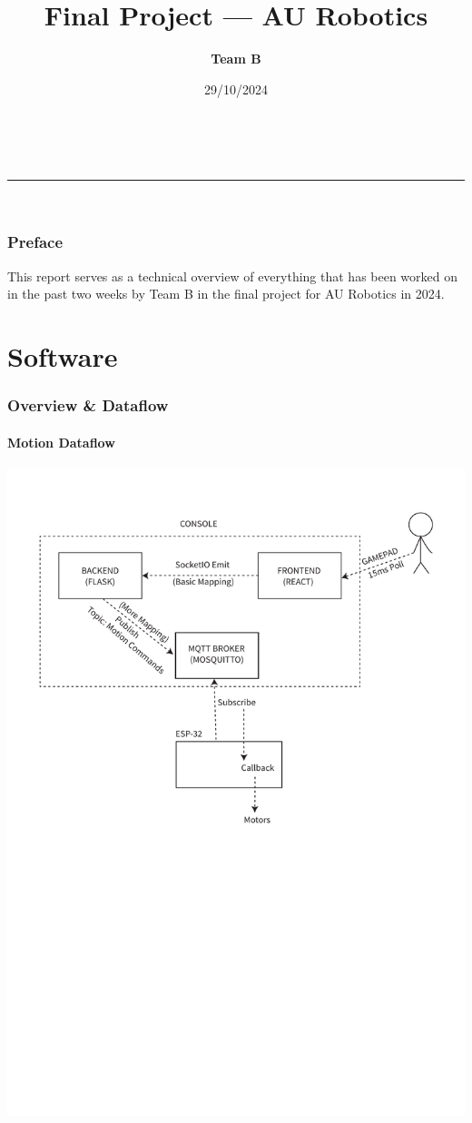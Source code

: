 \documentclass[a4paper,12pt]{article}
\makeatletter
\newcommand{\linia}{\rule{\linewidth}{0.5pt}}
\renewcommand{\maketitle}{
\begin{center}
\vspace{2ex}
{\huge \textbf{\@title}}
\vspace{1ex}
\\
\linia\\
\textsf{\@date \hfill
\@author}
\vspace{4ex}
\end{center}
}
\renewcommand\tableofcontents{%
    \section*{\makebox[\linewidth][c]{\contentsname}%
      \@mkboth{\MakeUppercase\contentsname}{\MakeUppercase\contentsname}}%
    \begin{multicols}{2}%
    \@starttoc{toc}%
    \end{multicols}
    }
\makeatother
\begin{document}
\fontsize{14}{16}\selectfont

\title{Final Project --- AU Robotics}

\date{29/10/2024}

\author{\textbf{Team B}}

\maketitle

\section*{Preface}

This report serves as a technical overview of everything that has been worked on in the past two weeks by Team B in the final project for AU Robotics in 2024.\\

\tableofcontents
\newpage
\part{Software}
\section{Overview \& Dataflow} \label{dataflow}
\subsection{Motion Dataflow} \label{motflow}
\includegraphics[trim=40 380 0 57,scale=0.95,clip]{diagrams/mot.pdf}
\end{document}
